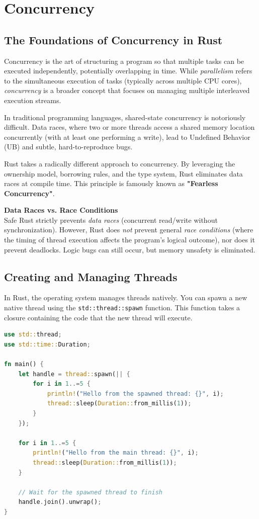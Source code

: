 \chapter{Concurrency}

\section{The Foundations of Concurrency in Rust}

Concurrency is the art of structuring a program so that multiple tasks can be executed independently, potentially overlapping in time. While \textit{parallelism} refers to the simultaneous execution of tasks (typically across multiple CPU cores), \textit{concurrency} is a broader concept that focuses on managing multiple interleaved execution streams.

In traditional programming languages, shared-state concurrency is notoriously difficult. Data races, where two or more threads access a shared memory location concurrently (with at least one performing a write), lead to Undefined Behavior (UB) and subtle, hard-to-reproduce bugs. 

Rust takes a radically different approach to concurrency. By leveraging the ownership model, borrowing rules, and the type system, Rust eliminates data races at compile time. This principle is famously known as \textbf{"Fearless Concurrency"}.

\begin{insightbox}
\textbf{Data Races vs. Race Conditions} \\
Safe Rust strictly prevents \textit{data races} (concurrent read/write without synchronization). However, Rust does \textit{not} prevent general \textit{race conditions} (where the timing of thread execution affects the program's logical outcome), nor does it prevent deadlocks. Logic bugs can still occur, but memory unsafety is eliminated.
\end{insightbox}

\section{Creating and Managing Threads}

In Rust, the operating system manages threads natively. You can spawn a new native thread using the \texttt{std::thread::spawn} function. This function takes a closure containing the code that the new thread will execute.

\begin{lstlisting}[language=Rust]
use std::thread;
use std::time::Duration;

fn main() {
    let handle = thread::spawn(|| {
        for i in 1..=5 {
            println!("Hello from the spawned thread: {}", i);
            thread::sleep(Duration::from_millis(1));
        }
    });

    for i in 1..=5 {
        println!("Hello from the main thread: {}", i);
        thread::sleep(Duration::from_millis(1));
    }

    // Wait for the spawned thread to finish
    handle.join().unwrap();
}
\end{lstlisting}

